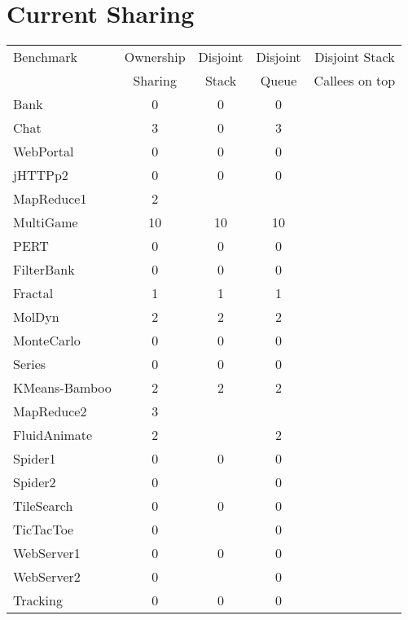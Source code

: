 \documentclass{amsart}[9pt]
\begin{document}
\section{Current Sharing}

\begin{tabular}{|l|c|c|c|c|}
\hline
Benchmark     & Ownership & Disjoint & Disjoint & Disjoint Stack \\
              & Sharing   & Stack    & Queue    & Callees on top \\
\hline
Bank          & 0         & 0                 & 0             &         \\
Chat          & 3         & 0                 & 3             &         \\
WebPortal     & 0         & 0                 & 0             &         \\
jHTTPp2       & 0         & 0                 & 0             &         \\
MapReduce1    & 2         & \color{red}{1}    & \color{red}{1}&         \\
MultiGame     & 10        & 10                & 10            &         \\
PERT          & 0         & 0                 & 0             &         \\
FilterBank    & 0         & 0                 & 0             &         \\
Fractal       & 1         & 1                 & 1             &         \\
MolDyn        & 2         & 2                 & 2             &         \\
MonteCarlo    & 0         & 0                 & 0             &         \\
Series        & 0         & 0                 & 0             &         \\
KMeans-Bamboo & 2         & 2                 & 2             &         \\
MapReduce2    & 3         & \color{red}{0}    & \color{red}{0}&         \\
FluidAnimate  & 2         & \color{red}{error}& 2             &         \\
Spider1       & 0         & 0                 & 0             &         \\
Spider2       & 0         & \color{red}{error}& 0             &         \\
TileSearch    & 0         & 0                 & 0             &         \\
TicTacToe     & 0         & \color{red}{error}& 0             &         \\
WebServer1    & 0         & 0                 & 0             &         \\
WebServer2    & 0         & \color{red}{error}& 0             &         \\
Tracking      & 0         & 0                 & 0             &         \\
\hline
\end{tabular}
\end{document}
